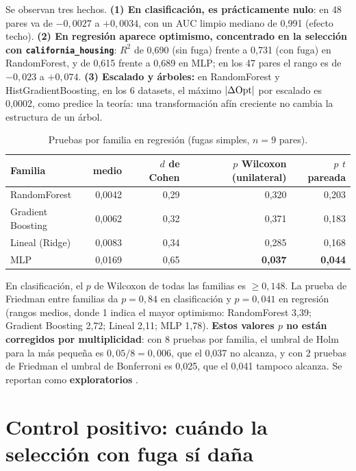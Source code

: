 Se observan tres hechos. \textbf{(1) En clasificación, \DOpt{} es prácticamente nulo}: en 48 pares va de $-0{,}0027$ a $+0{,}0034$, con un AUC limpio mediano de 0,991 (efecto techo). \textbf{(2) En regresión aparece optimismo, concentrado en la selección con \texttt{california\_housing}}: $R^2$ de 0,690 (sin fuga) frente a 0,731 (con fuga) en RandomForest, y de 0,615 frente a 0,689 en MLP; en los 47 pares el rango es de $-0{,}023$ a $+0{,}074$. \textbf{(3) Escalado y árboles:} en RandomForest y HistGradientBoosting, en los 6 datasets, el máximo $|\Delta\mathrm{Opt}|$ por escalado es 0,0002, como predice la teoría: una transformación afín creciente no cambia la estructura de un árbol.

\begin{table}[H]
\centering
\caption{Pruebas por familia en regresión (fugas simples, $n=9$ pares).}
\label{tab:tests}
\begingroup\footnotesize\singlespacing
\begin{tabular}{@{}l r r r r@{}}
\toprule
Familia & \DOpt{} medio & $d$ de Cohen & $p$ Wilcoxon (unilateral) & $p$ $t$ pareada \\
\midrule
RandomForest & 0,0042 & 0,29 & 0,320 & 0,203 \\
Gradient Boosting & 0,0062 & 0,32 & 0,371 & 0,183 \\
Lineal (Ridge) & 0,0083 & 0,34 & 0,285 & 0,168 \\
MLP & 0,0169 & 0,65 & \textbf{0,037} & \textbf{0,044} \\
\bottomrule
\end{tabular}
\endgroup
\end{table}

En clasificación, el $p$ de Wilcoxon de todas las familias es $\geq 0{,}148$. La prueba de Friedman entre familias da $p=0{,}84$ en clasificación y $p=0{,}041$ en regresión (rangos medios, donde 1 indica el mayor optimismo: RandomForest 3,39; Gradient Boosting 2,72; Lineal 2,11; MLP 1,78). \textbf{Estos valores $p$ no están corregidos por multiplicidad}: con 8 pruebas por familia, el umbral de Holm para la más pequeña es $0{,}05/8=0{,}006$, que el 0,037 no alcanza, y con 2 pruebas de Friedman el umbral de Bonferroni es 0,025, que el 0,041 tampoco alcanza. Se reportan como \textbf{exploratorios} \parencite[véase][]{demsar2006}.

\section{Control positivo: cuándo la selección con fuga sí daña}
\label{sec:control}

